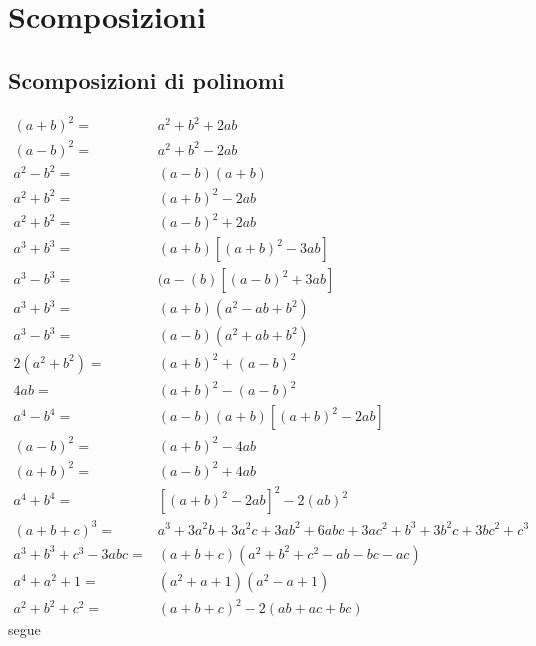\chapter{Scomposizioni}\label{ch:scomposizioni}
\section{Scomposizioni di polinomi}
\begin{thm}\label{thm:scomposizioni}
\begin{align}
(a+b)^2=&{}a^2+b^2+2ab\\
(a-b)^2=&{}a^2+b^2-2ab\\
a^2-b^2=&{}(a-b)(a+b)\\
a^2+b^2=&{}(a+b)^2-2ab\\
a^2+b^2=&{}(a-b)^2+2ab\\
a^3+b^3=&{}(a+b)[(a+b)^2-3ab]\label{eq:ascomp1}\\
a^3-b^3=&{}(a-(b)[(a-b)^2+3ab]\label{eq:ascomp2}\\
a^3+b^3=&{}(a+b)(a^2-ab+b^2)\label{eq:ascomp3}\\
a^3-b^3=&{}(a-b)(a^2+ab+b^2)\label{eq:ascomp4}\\
2(a^2+b^2)=&{}(a+b)^2+(a-b)^2\label{eq:ascomp5}\\
4ab=&{}(a+b)^2-(a-b)^2\label{eq:ascomp6}\\
a^4-b^4=&{}(a-b)(a+b)[(a+b)^2-2ab]\label{eq:ascomp7}\\
(a-b)^2=&{}(a+b)^2-4ab\label{eq:ascomp8}\\
(a+b)^2=&{}(a-b)^2+4ab\label{eq:ascomp9}\\
a^4+b^4=&{}[(a+b)^2-2ab]^2-2(ab)^2\label{eq:ascomp10}\\
(a+b+c)^3=&{}a^3 + 3a^2b + 3a^2c + 3ab^2 + 6abc + 3ac^2 + b^3 + 3b^2c + 3bc^2 + c^3\\
a^3+b^3+c^3-3abc=&{}(a+b+c)(a^2+b^2+c^2-ab-bc-ac)\label{eq:ascomp11}\\
a^4+a^2+1=&{}(a^2+a+1)(a^2-a+1)\label{eq:ascomp12}\\
a^2+b^2+c^2=&{}(a+b+c)^2-2(ab+ac+bc)\label{eq:ascomp13}
\end{align}
segue
\end{thm}
